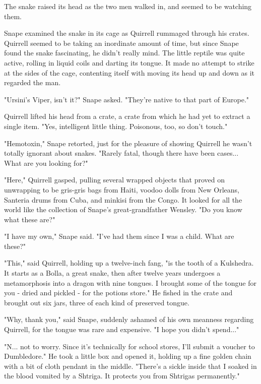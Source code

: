 The snake raised its head as the two men walked in, and seemed to be watching them.

Snape examined the snake in its cage as Quirrell rummaged through his crates. Quirrell seemed to be taking an inordinate amount of time, but since Snape found the snake fascinating, he didn't really mind. The little reptile was quite active, rolling in liquid coils and darting its tongue. It made no attempt to strike at the sides of the cage, contenting itself with moving its head up and down as it regarded the man.

"Ursini's Viper, isn't it?" Snape asked. "They're native to that part of Europe."

Quirrell lifted his head from a crate, a crate from which he had yet to extract a single item. "Yes, intelligent little thing. Poisonous, too, so don't touch."

"Hemotoxin," Snape retorted, just for the pleasure of showing Quirrell he wasn't totally ignorant about snakes. "Rarely fatal, though there have been cases... What are you looking for?"

"Here," Quirrell gasped, pulling several wrapped objects that proved on unwrapping to be gris-gris bags from Haiti, voodoo dolls from New Orleans, Santeria drums from Cuba, and minkisi from the Congo. It looked for all the world like the collection of Snape's great-grandfather Wensley. "Do you know what these are?"

"I have my own," Snape said. "I've had them since I was a child. What are these?"

"This," said Quirrell, holding up a twelve-inch fang, "is the tooth of a Kulshedra. It starts as a Bolla, a great snake, then after twelve years undergoes a metamorphosis into a dragon with nine tongues. I brought some of the tongue for you - dried and pickled - for the potions store." He fished in the crate and brought out six jars, three of each kind of preserved tongue.

"Why, thank you," said Snape, suddenly ashamed of his own meanness regarding Quirrell, for the tongue was rare and expensive. "I hope you didn't spend..."

"N... not to worry. Since it's technically for school stores, I'll submit a voucher to Dumbledore." He took a little box and opened it, holding up a fine golden chain with a bit of cloth pendant in the middle. "There's a sickle inside that I soaked in the blood vomited by a Shtriga. It protects you from Shtrigas permanently."

